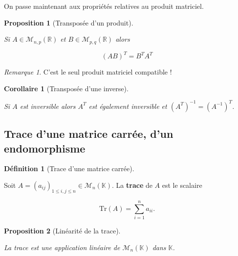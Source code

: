\documentclass[
  french,
  letterpaper,
  DIV=11,
  numbers=noendperiod]{scrreprt}
\theoremstyle{plain}
\theoremstyle{definition}
\newtheorem{definition}{Définition}[chapter]
\theoremstyle{plain}
\newtheorem{proposition}{Proposition}[chapter]
\theoremstyle{plain}
\theoremstyle{definition}
\theoremstyle{definition}
\theoremstyle{plain}
\newtheorem{corollary}{Corollaire}[chapter]
\theoremstyle{remark}
\newtheorem{refremark}{Remarque}[chapter]
\begin{document}
On passe maintenant aux propriétés relatives au produit matriciel.

\begin{proposition}[Transposée d'un
produit]\protect\hypertarget{prp-transposee-produit}{}\label{prp-transposee-produit}

Si \(A \in \mathcal{M}_{n,p}(\mathbb{R})\) et
\(B \in \mathcal{M}_{p,q}(\mathbb{R})\) alors

\[
    (AB)^{T} = B^{T}A^{T}
\]

\end{proposition}

\begin{refremark}
C'est le seul produit matriciel compatible !

\label{rem-sens}

\end{refremark}

\begin{corollary}[Transposée d'une
inverse]\protect\hypertarget{cor-inverse}{}\label{cor-inverse}

Si \(A\) est inversible alors \(A^{T}\) est également inversible et
\((A^{T})^{-1}=(A^{-1})^{T}\).

\end{corollary}

\subsection{Trace d'une matrice carrée, d'un
endomorphisme}\label{trace-dune-matrice-carruxe9e-dun-endomorphisme}

\begin{definition}[Trace d'une matrice
carrée]\protect\hypertarget{def-trace}{}\label{def-trace}

Soit \(A = (a_{ij})_{1 \leqslant i,j \leqslant n}\in
\mathcal{M}_{n}(\mathbb{K})\). La \textbf{trace} de \(A\) est le
scalaire

\[
    \mathrm{Tr}(A) = \sum_{i=1}^{n} a_{ii}.
\]

\end{definition}

\begin{proposition}[Linéarité de la
trace]\protect\hypertarget{prp-trace}{}\label{prp-trace}

La trace est une application linéaire de \(\mathcal{M}_{n}(\mathbb{K})\)
dans \(\mathbb{K}\).

\end{proposition}
\end{document}
